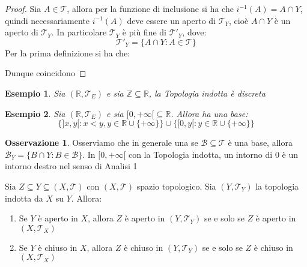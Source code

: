 \documentclass[11pt,a4paper,twoside]{article}
\newtheorem{es}{Esempio}
\theoremstyle{definition}
\newtheorem*{oss}{Osservazione}
\begin{document}
\begin{proof}
	Sia $A \in \mathcal T$, allora per la funzione di inclusione si ha che $i^{-1}(A) = A \cap Y$, quindi necessariamente $i^{-1}(A)$ deve essere un aperto di $\mathcal T_Y$, cioè $A \cap Y$ è un aperto di $\mathcal T_Y$. In particolare $\mathcal T_Y$ è più fine di $\mathcal T'_{Y}$, dove:
	\[\mathcal T'_{Y} = \{A \cap Y: A \in \mathcal T\}\]
	Per la prima definizione si ha che:

	\begin{center}
	\end{center}
	Dunque coincidono
\end{proof}

\begin{es}
	Sia $(\mathbb R, \mathcal T_E)$ e sia $\mathbb Z \subseteq \mathbb R$, la Topologia indotta è discreta
\end{es}

\begin{es}
	Sia $(\mathbb R, \mathcal T_E)$ e sia $[0, +\infty[ \subseteq \mathbb R$. Allora ha una base:
	\[ \{ ]x,y[:x<y, y \in \mathbb R \cup \{+ \infty\} \} \cup \{ [0, y[: y \in \mathbb R \cup \{+ \infty\}\} \]
\end{es}

\begin{oss}
	Osserviamo che in generale una se $\mathcal B \subseteq \mathcal T$ è una base, allora $\mathcal B_Y = \{B \cap Y: B \in \mathcal B\}$. In $[0, +\infty[$ con la Topologia indotta, un intorno di $0$ è un intorno destro nel senso di Analisi 1
\end{oss}

\begin{lemma}{}{}\label{LComodo}
	Sia $Z \subseteq Y \subseteq (X, \mathcal T)$ con $(X, \mathcal T)$ spazio topologico. Sia $(Y, \mathcal T_Y)$ la topologia indotta da $X$ su $Y$. Allora:
	\begin{enumerate}
		\item Se $Y$ è aperto in $X$, allora $Z$ è aperto in $(Y, \mathcal T_Y)$ se e solo se $Z$ è aperto in $(X, \mathcal T_X)$
		\item Se $Y$ è chiuso in $X$, allora $Z$ è chiuso in $(Y, \mathcal T_Y)$ se e solo se $Z$ è chiuso in $(X, \mathcal T_X)$
	\end{enumerate}
\end{lemma}
\end{document}
